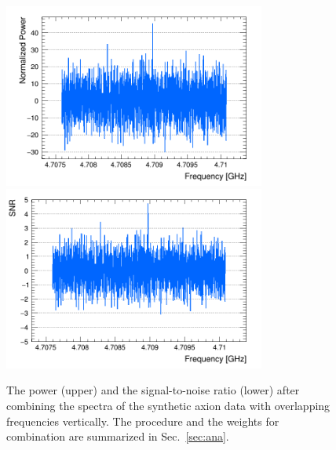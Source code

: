 \begin{figure}[htbp]                                                                                                  
    \centering                                                                                                                       
    \includegraphics[width=8.6cm]{figures/Power_CombSpectrum_FaxionRun_AllSteps_Rescan_SG4_W201.png}
    \includegraphics[width=8.6cm]{figures/SNR_CombSpectrum_FaxionRun_AllSteps_Rescan_SG4_W201.png}
    \caption{The power (upper) and the 
signal-to-noise ratio (lower) after combining the spectra 
of the synthetic axion data
with overlapping 
frequencies vertically. The procedure and the weights for combination 
are summarized in Sec.~\ref{sec:ana}.}                
\label{fig:faxioncombine}                                                                                                            
\end{figure}                       


